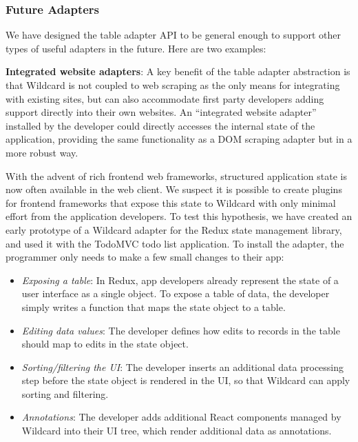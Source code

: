 \documentclass[sigplan,screen,10pt,anonymous,review]{acmart}
\providecommand{\tightlist}{%
  \setlength{\itemsep}{0pt}\setlength{\parskip}{0pt}}
\begin{document}
\hypertarget{future-adapters}{%
\subsubsection{Future Adapters}\label{future-adapters}}

We have designed the table adapter API to be general enough to support
other types of useful adapters in the future. Here are two examples:

\textbf{Integrated website adapters}: A key benefit of the table adapter
abstraction is that Wildcard is not coupled to web scraping as the only
means for integrating with existing sites, but can also accommodate
first party developers adding support directly into their own websites.
An ``integrated website adapter'' installed by the developer could
directly accesses the internal state of the application, providing the
same functionality as a DOM scraping adapter but in a more robust way.

With the advent of rich frontend web frameworks, structured application
state is now often available in the web client. We suspect it is
possible to create plugins for frontend frameworks that expose this
state to Wildcard with only minimal effort from the application
developers. To test this hypothesis, we have created an early prototype
of a Wildcard adapter for the Redux state management library, and used
it with the TodoMVC todo list application. To install the adapter, the
programmer only needs to make a few small changes to their app:

\begin{itemize}
\tightlist
\item
  \emph{Exposing a table}: In Redux, app developers already represent
  the state of a user interface as a single object. To expose a table of
  data, the developer simply writes a function that maps the state
  object to a table.
\item
  \emph{Editing data values}: The developer defines how edits to records
  in the table should map to edits in the state object.
\item
  \emph{Sorting/filtering the UI}: The developer inserts an additional
  data processing step before the state object is rendered in the UI, so
  that Wildcard can apply sorting and filtering.
\item
  \emph{Annotations}: The developer adds additional React components
  managed by Wildcard into their UI tree, which render additional data
  as annotations.
\end{itemize}
\end{document}
